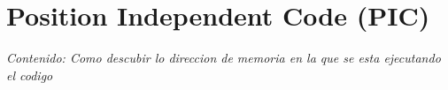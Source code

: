 \section{Position Independent Code (PIC)}

\textit{Contenido: Como descubir lo direccion de memoria en la que se esta 
ejecutando el codigo}
\vspace{1em}

